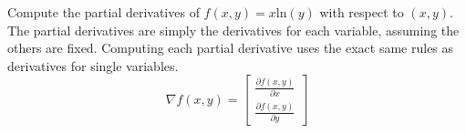 
Compute the partial derivatives  of $f(x,y) = x \text{ln}(y)$ with respect to $(x,y)$. The partial derivatives are simply the derivatives for each variable, assuming the others are fixed. Computing each partial derivative uses the exact same rules as derivatives for single variables.  
    \[
    \nabla f(x,y) =
        \begin{bmatrix}
            \frac{\partial f(x,y)}{\partial x} \\
            \frac{\partial f(x,y)}{\partial y} 
        \end{bmatrix}
    \]
    
    \vspace{20em}


